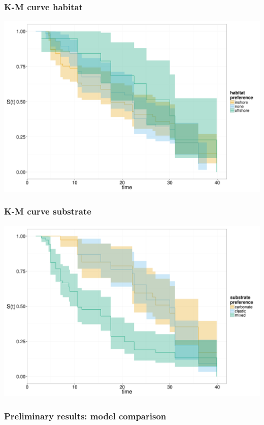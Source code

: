 \documentclass{beamer}
\begin{document}
\begin{frame}
  \frametitle{K-M curve habitat}
  \begin{center}
    \includegraphics[height = 0.8\textheight, width = \textwidth, keepaspectratio = true]{figure/km_hab}
  \end{center}
\end{frame}

\begin{frame}
  \frametitle{K-M curve substrate}
  \begin{center}
    \includegraphics[height = 0.8\textheight, width = \textwidth, keepaspectratio = true]{figure/km_aff}
  \end{center}
\end{frame}

\begin{frame}
  \frametitle{Preliminary results: model comparison}

  
\end{frame}
\end{document}
